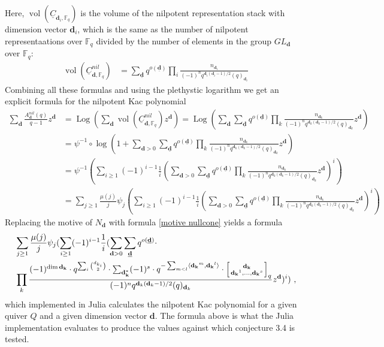 \documentclass{article}
\newcommand{\bd}{\mathbf{d}}
\DeclareMathOperator{\vol}{vol}
\DeclareMathOperator{\Log}{Log}
\begin{document}
Here, $\vol (\underline{C}_{\bd_i, \mathbb{F}_q})$ is the volume of the nilpotent representation stack with dimension vector $\bd_i$, which is the same as the number of nilpotent representaations over $\mathbb{F}_q$ divided by the number of elements in the group $GL_{\bd}$ over $\mathbb{F}_q$:
\begin{align}\label{volume nilp repres stack}
    \vol(\underline{C}^{nil}_{\bd, \mathbb{F}_q}) &= \sum_{\underline{\bd}} q^{o(\underline{\bd})} \prod_i \frac{n_{\bd_i}}{(-1)^n q^{\bd_i(\bd_i-1)/2}(q)_{\bd_i}}
\end{align}
Combining all these formulas and using the plethystic logarithm we get an explicit formula for the nilpotent Kac polynomial
\begin{align*}
  \sum_{\bd}  \frac{A_{\bd}^{nil}(q)}{q-1}z^{\bd} &= \Log (\sum_{\bd} \vol(\underline{C}^{nil}_{\bd, \mathbb{F}_q}) z^{\bd}) = \Log (\sum_{\bd} \sum_{\underline{\bd}} q^{o(\underline{\bd})} \prod_k \frac{n_{\bd_k}}{(-1)^n q^{\bd_k(\bd_k-1)/2}(q)_{\bd_k}} z^{\bd}) \\
  &= \psi^{-1} \circ \log (1+\sum_{\bd >0} \sum_{\underline{\bd}} q^{o(\underline{\bd})} \prod_k \frac{n_{\bd_k}}{(-1)^n q^{\bd_k(\bd_k-1)/2}(q)_{\bd_k}} z^{\bd}) \\
  &= \psi^{-1} (\sum_{i \geq 1} (-1)^{i-1} \frac{1}{i} (\sum_{\bd >0} \sum_{\underline{\bd}} q^{o(\underline{\bd})} \prod_k \frac{n_{\bd_k}}{(-1)^n q^{\bd_k(\bd_k-1)/2}(q)_{\bd_k}} z^{\bd})^i) \\
  &= \sum_{j\geq 1} \frac{\mu(j)}{j} \psi_j(\sum_{i \geq 1} (-1)^{i-1} \frac{1}{i} (\sum_{\bd >0} \sum_{\underline{\bd}} q^{o(\underline{\bd})} \prod_k \frac{n_{\bd_k}}{(-1)^n q^{\bd_k(\bd_k-1)/2}(q)_{\bd_k}} z^{\bd})^i)
  \end{align*}
  Replacing the motive of $N_{\bd}$ with formula \ref{motive nullcone} yields a formula
  \begin{align*}
  &\sum_{j\geq 1} \frac{\mu(j)}{j} \psi_j(\sum_{i \geq 1} (-1)^{i-1} \frac{1}{i} (\sum_{\bd >0} \sum_{\underline{\bd}} q^{o(\underline{\bd})} \cdot \\
  &\prod_k \frac{(-1)^{\dim {\bf d_k}}\cdot  q^{\sum_i{d_{k_i}\choose 2}}\cdot\sum_{\bf d_k^*}(-1)^s\cdot q^{-\sum_{m<l}\langle{\bf d_k}^m,{\bf d_k}^l\rangle}\cdot\left[{{\bf d_k}\atop{{\bf d_k}^1,\ldots,{\bf d_k}^s}}\right]_q}{(-1)^n q^{\bd_k(\bd_k-1)/2}(q)_{\bd_k}} z^{\bd})^i)~,
\end{align*}    
which implemented in Julia calculates the nilpotent Kac polynomial for a given quiver $Q$ and a given dimension vector $\bd$. The formula above is what the Julia implementation evaluates to produce the values against which conjecture 3.4 is tested.
\end{document}
